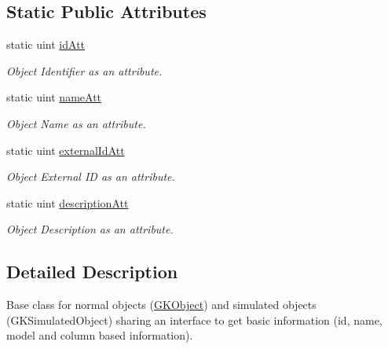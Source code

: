 \subsection*{Static Public Attributes}
\begin{DoxyCompactItemize}
\item 
static uint \hyperlink{classGKBaseObject_a692577c6db5ddebed9aec14ae0612271}{id\+Att}\hypertarget{classGKBaseObject_a692577c6db5ddebed9aec14ae0612271}{}\label{classGKBaseObject_a692577c6db5ddebed9aec14ae0612271}

\begin{DoxyCompactList}\small\item\em Object Identifier as an attribute. \end{DoxyCompactList}\item 
static uint \hyperlink{classGKBaseObject_a51c855051cf69dd505efe282088fbffe}{name\+Att}\hypertarget{classGKBaseObject_a51c855051cf69dd505efe282088fbffe}{}\label{classGKBaseObject_a51c855051cf69dd505efe282088fbffe}

\begin{DoxyCompactList}\small\item\em Object Name as an attribute. \end{DoxyCompactList}\item 
static uint \hyperlink{classGKBaseObject_a8287b7ae2c1c41363d3ad44dfc53190a}{external\+Id\+Att}\hypertarget{classGKBaseObject_a8287b7ae2c1c41363d3ad44dfc53190a}{}\label{classGKBaseObject_a8287b7ae2c1c41363d3ad44dfc53190a}

\begin{DoxyCompactList}\small\item\em Object External ID as an attribute. \end{DoxyCompactList}\item 
static uint \hyperlink{classGKBaseObject_a8faae8de2c0699fb9cda7cf0ea878f11}{description\+Att}\hypertarget{classGKBaseObject_a8faae8de2c0699fb9cda7cf0ea878f11}{}\label{classGKBaseObject_a8faae8de2c0699fb9cda7cf0ea878f11}

\begin{DoxyCompactList}\small\item\em Object Description as an attribute. \end{DoxyCompactList}\end{DoxyCompactItemize}


\subsection{Detailed Description}
Base class for normal objects (\hyperlink{classGKObject}{G\+K\+Object}) and simulated objects (G\+K\+Simulated\+Object) sharing an interface to get basic information (id, name, model and column based information). 

